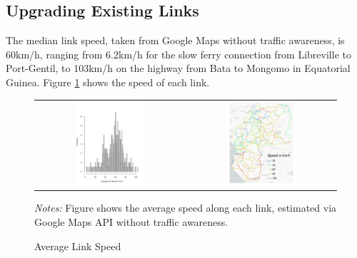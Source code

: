 \documentclass[a4paper]{article}
\begin{document}
\subsection{Upgrading Existing Links}

The median link speed, taken from Google Maps without traffic awareness, is 60km/h, ranging from 6.2km/h for the slow ferry connection from Libreville to Port-Gentil, to 103km/h on the highway from Bata to Mongomo in Equatorial Guinea. Figure \ref{fig:ALS} shows the speed of each link. 

\begin{figure}[H]  \vspace{-2mm}
\centering
\caption{\label{fig:ALS} Average Link Speed}
\vspace{2mm}
\begin{tabular}{cc}
\includegraphics[width=0.48\textwidth, trim = {0 0.4cm 1.5cm 2.5cm}, clip]{"../figures/trans_CEMAC_network_average_link_speed_hist_google.pdf"} &
\includegraphics[width=0.48\textwidth]{"../figures/trans_CEMAC_network_average_link_speed_google.pdf"}  \\ %
\end{tabular}
\scriptsize 
\emph{Notes:} Figure shows the average speed along each link, estimated via Google Maps API without traffic awareness. 
\end{figure}
\end{document}
